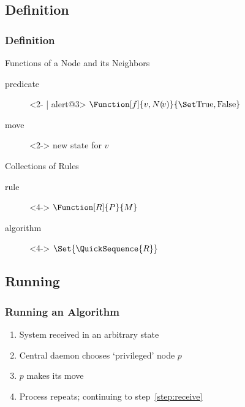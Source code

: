 \documentclass[
]{beamer}
\begin{document}
\subsection{Definition}
\begin{frame}
  \frametitle{Definition}
  \begin{block}{Functions of a Node and its Neighbors}
    \begin{description}
    \item[predicate]<2- | alert@3> $\Function[f]{v, N(\!v)}{\SetBoolean}$
    \item[move]<2-> new state for $v$
    \end{description}
  \end{block}
  \begin{block}{Collections of Rules}
    \begin{description}
    \item[rule]<4-> $\Function[R]{P}{M}$
    \item[algorithm]<4-> $\Set{\QuickSequence{R}}$
    \end{description}
  \end{block}
\end{frame}

\subsection{Running}
\begin{frame}
  \frametitle{Running an Algorithm}
  \begin{enumerate}[<+->]
  \item System received in an arbitrary state \label{step:receive}
  \item Central daemon chooses \enquote*{privileged} node $p$
  \item $p$ makes its move
  \item Process repeats; continuing to step~\autoref{step:receive}
  \end{enumerate}
\end{frame}
\end{document}
